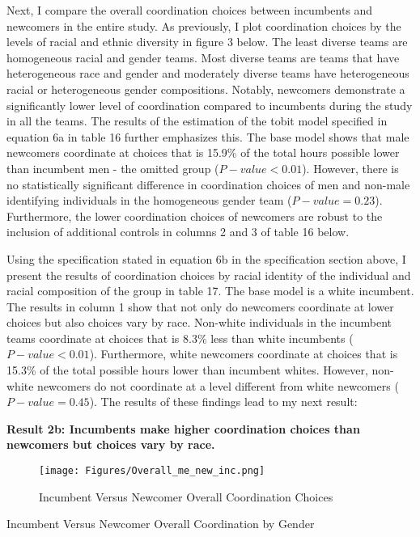 \hspace  *{0mm} Next, I compare the overall coordination choices between incumbents and newcomers in the entire study. As previously, I plot coordination choices by the levels of racial and ethnic diversity in figure 3 below. The least diverse teams are homogeneous racial and gender teams. Most diverse teams are teams that have heterogeneous race and gender and moderately diverse teams have heterogeneous racial or heterogeneous gender compositions. Notably, newcomers demonstrate a significantly lower level of coordination compared to incumbents during the study in all the teams. The results of the estimation of the tobit model specified in equation 6a in table 16 further emphasizes this. The base model shows that male newcomers coordinate at choices that is 15.9\% of the total hours possible lower than incumbent men - the omitted group ($P-value<0.01$). However, there is no statistically significant difference in coordination choices of men and non-male identifying individuals in the homogeneous gender team ($P-value=0.23$). Furthermore, the lower coordination choices of newcomers are robust to the inclusion of additional controls in columns 2 and 3 of table 16 below.  

Using the specification stated in equation 6b in the specification section above, I present the results of coordination choices by racial identity of the individual and racial composition of the group in table 17. The base model is a white incumbent. The results in column 1 show that not only do newcomers coordinate at lower choices but also choices vary by race. Non-white individuals in the incumbent teams coordinate at choices that is 8.3\% less than white incumbents ($P-value<0.01$). Furthermore, white newcomers coordinate at choices that is 15.3\% of the total possible hours lower than incumbent whites. However, non-white newcomers do not coordinate at a level different from white newcomers ($P-value=0.45$). The results of these findings lead to my next result: 

\textbf{Result 2b: Incumbents make higher coordination choices than newcomers but choices vary by race.}

\begin{figure}[H]
\captionsetup{justification=raggedright,singlelinecheck=false}
\caption{Incumbent Versus Newcomer Overall Coordination Choices}
\texttt{[image: Figures/Overall\_me\_new\_inc.png]} 
\end{figure}

\begin{table}[H]
 \captionsetup{justification=raggedright,singlelinecheck=false}
\caption{Incumbent Versus Newcomer Overall Coordination by Gender} \label{tab:table9}
    \begin{center}
        
    \end{center}
\end{table}


